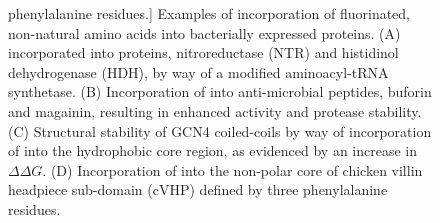 \begin{refsection}
\begin{figure}[h!]
        phenylalanine residues.]
        {Examples of incorporation of fluorinated, non-natural amino acids
        into bacterially expressed proteins.
        (A)
         incorporated into
         proteins, nitroreductase (NTR) and histidinol
        dehydrogenase (HDH), by way of a modified aminoacyl-tRNA
        synthetase.\cite{Jackson2007}
        (B)
        Incorporation of  into anti-microbial
        peptides, buforin and magainin, resulting in enhanced activity and
        protease stability.\cite{Meng2007}
        (C) Structural stability of GCN4 coiled-coils by way
        of incorporation of  into the hydrophobic
        core region, as evidenced by an increase in ${\Delta\Delta
        G}$.\cite{Lee2004}
        (D)
        Incorporation of  into the non-polar
        core of chicken villin headpiece sub-domain (cVHP) defined by three
        phenylalanine residues.\cite{Woll2006}}
        \label{fig:fluorination_examples}
    \end{figure}


\end{refsection}
